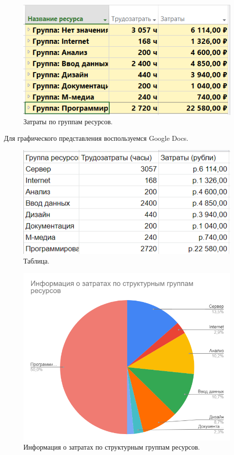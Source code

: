 \documentclass[a4paper,14pt]{extreport} %
\begin{document}
\begin{enumerate}
\begin{figure}[H]
  \centering
  \caption{Затраты по группам ресурсов. }
  \includegraphics[scale=0.6]{3}
\end{figure}

Для графического представления воспользуемся Google Docs.

\begin{figure}[H]
  \centering
  \caption{Таблица. }
  \includegraphics[scale=1]{table}
\end{figure}

\begin{figure}[H]
  \centering
  \caption{Информация о затратах по структурным группам ресурсов. }
  \includegraphics[scale=0.8]{d1}
\end{figure}


\end{enumerate}
\end{document}
